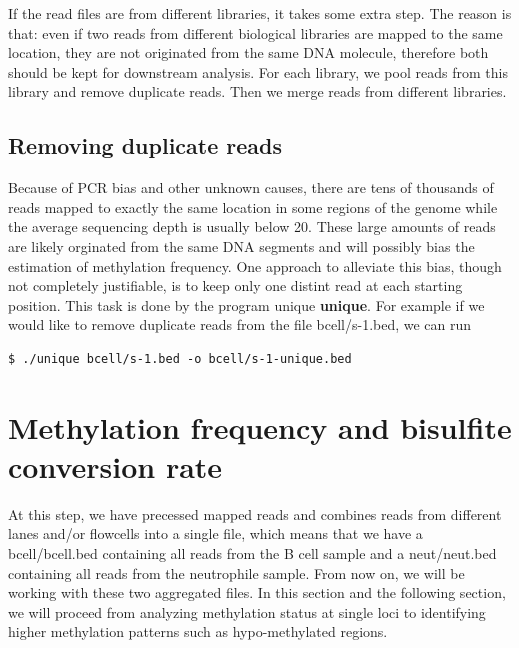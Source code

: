 \documentclass{article}
\begin{document}
If the read files are from different libraries, it takes some extra
step. The reason is that: even if two reads from different biological
libraries are mapped to the same location, they are not originated
from the same DNA molecule, therefore both should be kept for
downstream analysis. For each library, we pool reads from this library
and remove duplicate reads. Then we merge reads from different
libraries. 

\subsection{Removing duplicate reads}
\label{sec:proc-dupl-reads}
Because of PCR bias and other unknown causes, there are tens of
thousands of reads mapped to exactly the same location in some regions
of the genome while the average sequencing depth is usually below
20. These large amounts of reads are likely orginated from the same
DNA segments and will possibly bias the estimation of methylation
frequency. One approach to alleviate this bias, though not completely
justifiable, is to keep only one distint read at each starting
position. This task is done by the program unique \textbf{unique}. For
example if we would like to remove duplicate reads from the file
bcell/s-1.bed, we can run 
\begin{verbatim}
$ ./unique bcell/s-1.bed -o bcell/s-1-unique.bed
\end{verbatim}

\section{Methylation frequency and bisulfite conversion rate}
\label{sec:estim-methyl-freq}
At this step, we have precessed mapped reads and combines reads from
different lanes and/or flowcells into a single file, which means that
we have a bcell/bcell.bed containing all reads from the B cell sample
and a neut/neut.bed containing all reads from the neutrophile
sample. From now on, we will be working with these two aggregated
files. In this section and the following section, we will proceed from
analyzing methylation status at single loci to identifying higher
methylation patterns such as hypo-methylated regions. 
\end{document}
